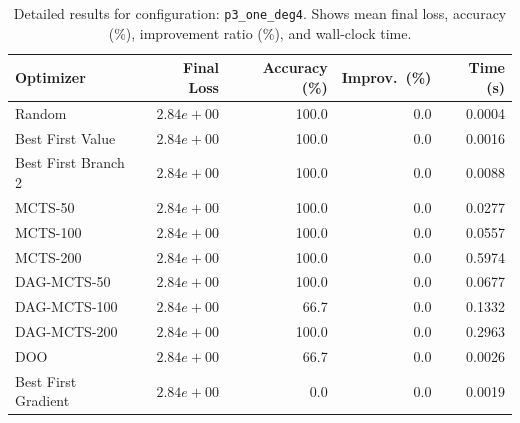 \begin{table}[H]
\centering
\caption{Detailed results for configuration: \texttt{p3\_one\_deg4}. Shows mean final loss, accuracy (\%), improvement ratio (\%), and wall-clock time.}
\label{tab:funclearn-detail-15}
\begin{tabular}{lrrrr}
\toprule
Optimizer & Final Loss & Accuracy (\%) & Improv.~(\%) & Time (s) \\
\midrule
Random & \textbf{$2.84e+00$} & 100.0 & 0.0 & 0.0004 \\
\hline
Best First Value & \textbf{$2.84e+00$} & 100.0 & 0.0 & 0.0016 \\
\hline
Best First Branch 2 & \textbf{$2.84e+00$} & 100.0 & 0.0 & 0.0088 \\
\hline
MCTS-50 & \textbf{$2.84e+00$} & 100.0 & 0.0 & 0.0277 \\
\hline
MCTS-100 & \textbf{$2.84e+00$} & 100.0 & 0.0 & 0.0557 \\
\hline
MCTS-200 & \textbf{$2.84e+00$} & 100.0 & 0.0 & 0.5974 \\
\hline
DAG-MCTS-50 & \textbf{$2.84e+00$} & 100.0 & 0.0 & 0.0677 \\
\hline
DAG-MCTS-100 & \textbf{$2.84e+00$} & 66.7 & 0.0 & 0.1332 \\
\hline
DAG-MCTS-200 & \textbf{$2.84e+00$} & 100.0 & 0.0 & 0.2963 \\
\hline
DOO & \textbf{$2.84e+00$} & 66.7 & 0.0 & 0.0026 \\
\hline
Best First Gradient & \textbf{$2.84e+00$} & 0.0 & 0.0 & 0.0019 \\
\bottomrule
\end{tabular}
\end{table}

